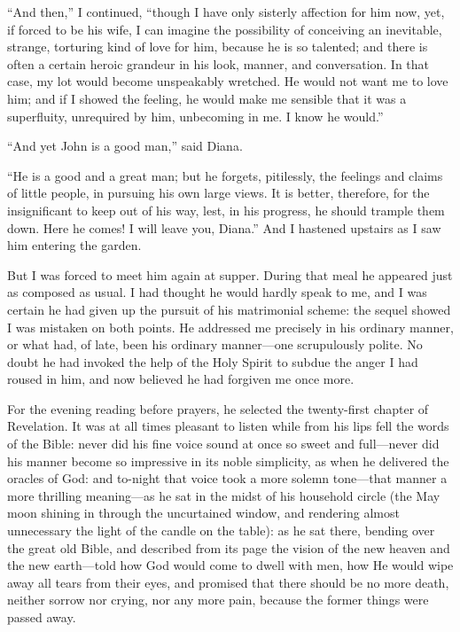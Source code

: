 \enquote{And then,} I continued, \enquote{though I have only sisterly
affection for him now, yet, if forced to be his wife, I can imagine the
possibility of conceiving an inevitable, strange, torturing kind of love
for him, because he is so talented; and there is often a certain heroic
grandeur in his look, manner, and conversation. In that case, my lot
would become unspeakably wretched. He would not want me to love him;
and if I showed the feeling, he would make me sensible that it was a
superfluity, unrequired by him, unbecoming in me. I know he would.}

\enquote{And yet \St{} John is a good man,} said Diana.

\enquote{He is a good and a great man; but he forgets, pitilessly, the
feelings and claims of little people, in pursuing his own large views. 
It is better, therefore, for the insignificant to keep out of his way,
lest, in his progress, he should trample them down. Here he comes! I
will leave you, Diana.} And I hastened upstairs as I saw him entering
the garden.

But I was forced to meet him again at supper. During that meal he
appeared just as composed as usual. I had thought he would hardly speak
to me, and I was certain he had given up the pursuit of his matrimonial
scheme: the sequel showed I was mistaken on both points. He addressed
me precisely in his ordinary manner, or what had, of late, been his
ordinary manner---one scrupulously polite. No doubt he had invoked the
help of the Holy Spirit to subdue the anger I had roused in him, and now
believed he had forgiven me once more.

For the evening reading before prayers, he selected the twenty-first
chapter of Revelation. It was at all times pleasant to listen while
from his lips fell the words of the Bible: never did his fine voice
sound at once so sweet and full---never did his manner become so
impressive in its noble simplicity, as when he delivered the oracles of
God: and to-night that voice took a more solemn tone---that manner a
more thrilling meaning---as he sat in the midst of his household circle
(the May moon shining in through the uncurtained window, and rendering
almost unnecessary the light of the candle on the table): as he sat
there, bending over the great old Bible, and described from its page the
vision of the new heaven and the new earth---told how God would come to
dwell with men, how He would wipe away all tears from their eyes, and
promised that there should be no more death, neither sorrow nor crying,
nor any more pain, because the former things were passed away.


